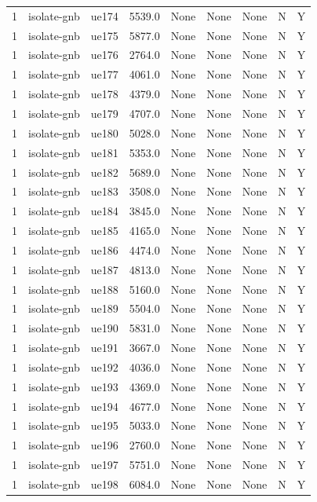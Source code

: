 \begin{table}[ht]
\begin{tabular}{|c|c|c|c|c|c|c|c|c|}
1 & isolate-gnb & ue174 & 5539.0 & None & None & None & N & Y \\
1 & isolate-gnb & ue175 & 5877.0 & None & None & None & N & Y \\
1 & isolate-gnb & ue176 & 2764.0 & None & None & None & N & Y \\
1 & isolate-gnb & ue177 & 4061.0 & None & None & None & N & Y \\
1 & isolate-gnb & ue178 & 4379.0 & None & None & None & N & Y \\
1 & isolate-gnb & ue179 & 4707.0 & None & None & None & N & Y \\
1 & isolate-gnb & ue180 & 5028.0 & None & None & None & N & Y \\
1 & isolate-gnb & ue181 & 5353.0 & None & None & None & N & Y \\
1 & isolate-gnb & ue182 & 5689.0 & None & None & None & N & Y \\
1 & isolate-gnb & ue183 & 3508.0 & None & None & None & N & Y \\
1 & isolate-gnb & ue184 & 3845.0 & None & None & None & N & Y \\
1 & isolate-gnb & ue185 & 4165.0 & None & None & None & N & Y \\
1 & isolate-gnb & ue186 & 4474.0 & None & None & None & N & Y \\
1 & isolate-gnb & ue187 & 4813.0 & None & None & None & N & Y \\
1 & isolate-gnb & ue188 & 5160.0 & None & None & None & N & Y \\
1 & isolate-gnb & ue189 & 5504.0 & None & None & None & N & Y \\
1 & isolate-gnb & ue190 & 5831.0 & None & None & None & N & Y \\
1 & isolate-gnb & ue191 & 3667.0 & None & None & None & N & Y \\
1 & isolate-gnb & ue192 & 4036.0 & None & None & None & N & Y \\
1 & isolate-gnb & ue193 & 4369.0 & None & None & None & N & Y \\
1 & isolate-gnb & ue194 & 4677.0 & None & None & None & N & Y \\
1 & isolate-gnb & ue195 & 5033.0 & None & None & None & N & Y \\
1 & isolate-gnb & ue196 & 2760.0 & None & None & None & N & Y \\
1 & isolate-gnb & ue197 & 5751.0 & None & None & None & N & Y \\
1 & isolate-gnb & ue198 & 6084.0 & None & None & None & N & Y \\

\end{tabular}
\end{table}
